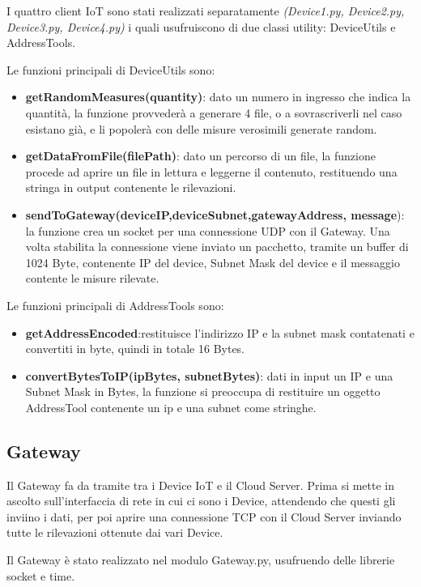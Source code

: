 \documentclass[a4paper,12pt]{report}
\begin{document}
	I quattro client IoT sono stati realizzati separatamente \textit{(Device1.py, Device2.py, Device3.py, Device4.py)} i quali usufruiscono di due classi utility: DeviceUtils e AddressTools.
	
	Le funzioni principali di DeviceUtils sono:
	\begin{itemize}
		\item\textbf{ getRandomMeasures(quantity)}: dato un numero in ingresso che indica la quantità, la funzione provvederà a generare 4 file, o a sovrascriverli nel caso esistano già, e li popolerà con delle misure verosimili generate random.
		\item \textbf{getDataFromFile(filePath)}: dato un percorso di un file, la funzione procede ad aprire un file in lettura e leggerne il contenuto, restituendo una stringa in output contenente le rilevazioni.
		\item \textbf{sendToGateway(deviceIP,deviceSubnet,gatewayAddress, message}): la funzione crea un socket per una connessione UDP con il Gateway. Una volta stabilita la connessione viene inviato un pacchetto, tramite un buffer di 1024 Byte, contenente IP del device, Subnet Mask del device e il messaggio contente le misure rilevate.
	\end{itemize}

	Le funzioni principali di AddressTools sono:
	\begin{itemize}
		\item \textbf{getAddressEncoded}:restituisce l'indirizzo IP e la subnet mask contatenati e convertiti in byte, quindi in totale 16 Bytes.
		\item \textbf{convertBytesToIP(ipBytes, subnetBytes)}: dati in input un IP e una Subnet Mask in Bytes, la funzione si preoccupa di restituire un oggetto AddressTool contenente un ip e una subnet come stringhe.
	\end{itemize}

	\subsection{Gateway}
	Il Gateway fa da tramite tra i Device IoT e il Cloud Server. Prima si mette in ascolto sull'interfaccia di rete in cui ci sono i Device, attendendo che questi gli inviino i dati, per poi aprire una connessione TCP con il Cloud Server inviando tutte le rilevazioni ottenute dai vari Device.
	
	Il Gateway è stato realizzato nel modulo Gateway.py, usufruendo delle librerie socket e time.
	
\end{document}
